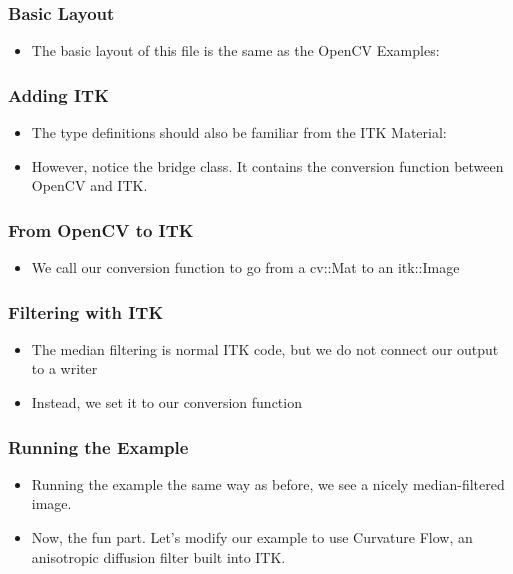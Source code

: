 \begin{frame}
\frametitle{Basic Layout}
\begin{itemize}
\item The basic layout of this file is the same as the OpenCV Examples:


\end{itemize}
\end{frame}

\begin{frame}
\frametitle{Adding ITK}
\begin{itemize}
\item The type definitions should also be familiar from the ITK Material:

\item However, notice the bridge class. It contains the conversion function
between OpenCV and ITK.

\end{itemize}
\end{frame}

\begin{frame}
\frametitle{From OpenCV to ITK}
\begin{itemize}
\item We call our conversion function to go from a cv::Mat to an itk::Image

\end{itemize}
\end{frame}

\begin{frame}
\frametitle{Filtering with ITK}
\begin{itemize}
\item The median filtering is normal ITK code, but we do not connect our
output to a writer

\pause
\item Instead, we set it to our conversion function

\end{itemize}
\end{frame}

\begin{frame}
\frametitle{Running the Example}
\begin{itemize}
\item Running the example the same way as before, we see a nicely
median-filtered image.
\pause
\item Now, the fun part. Let's modify our example to use Curvature Flow, an
anisotropic diffusion filter built into ITK.
\end{itemize}
\end{frame}


